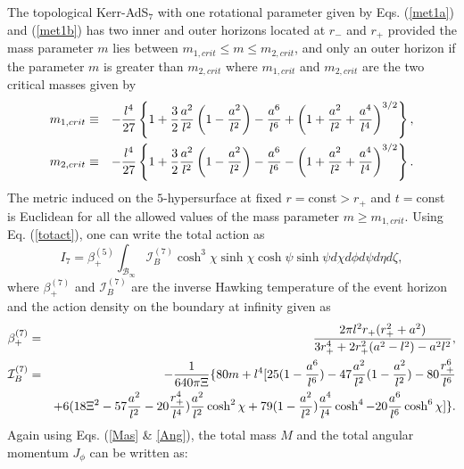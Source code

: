 \documentclass[a4paper,12pt,onecolumn]{revtex4}
\begin{document}
The topological Kerr-AdS$_7$ with one rotational parameter given
by Eqs. (\ref{met1a}) and (\ref{met1b}) has two inner and outer horizons located at $%
r_{-}$ and $r_{+}$ provided the mass parameter $m$ lies between $%
m_{1,crit}\leq m\leq m_{2,crit}$, and only an outer horizon if the parameter $%
m$ is greater than $m_{2,crit}$ where $m_{1,crit}$ and
$m_{2,crit}$ are the two critical masses given by
\begin{eqnarray}
m_{1,crit} &\equiv &-\frac{l^4}{27}\left\{1+\frac 32\frac{a^2}{l^2}\left(1-\frac{a^2}{%
l^2}\right)-\frac{a^6}{l^6}+\left(1+\frac{a^2}{l^2}+\frac{a^4}{l^4}\right)^{3/2}\right\},
\label{m1crit7} \\
m_{2,crit} &\equiv &-\frac{l^4}{27} \left\{1+\frac 32\frac{a^2}{l^2}\left(1-\frac{a^2}{%
l^2}\right)-\frac{a^6}{l^6}-\left(1+\frac{a^2}{l^2}+\frac{a^4}{l^4}\right)^{3/2}\right\}.
\label{M2crit7}
\end{eqnarray}
The metric induced on the $5$-hypersurface at fixed
$r=$const$>r_{+}$ and $t=$const is Euclidean for all the allowed
values of the mass parameter $m\geq m_{1,crit}$. Using Eq.
(\ref{totact}), one can write the total action as
\begin{equation}
I_7=\beta _{+}^{(5)}\int_{\mathcal{B}_\infty }\mathcal{I}_B^{(7)}\cosh
^3\chi \sinh \chi \cosh \psi \sinh \psi d\chi d\phi d\psi d\eta d\zeta ,
\label{Act7}
\end{equation}
where $\beta _{+}^{(7)}$ and $\mathcal{I}_B^{(7)}$ are the inverse
Hawking temperature of the event horizon and the action density on
the boundary at infinity given as
\begin{eqnarray*}
\beta _{+}^{(7)} &=&\frac{2\pi l^2r_{+}(r_{+}^2+a^2)}{%
3r_{+}^4+2r_{+}^2(a^2-l^2)-a^2l^2},  \label{Alph7} \\
\mathcal{I}_B^{(7)} &=&-\frac 1{640\pi \Xi } \{80m+l^4
[25(1-\frac{a^6}{l^6})-47 \frac{a^2}{l^2}(1-\frac{a^2}{l^2})-80
\frac{r^6_{+}}{l^6}\\ && +6(18 \Xi ^2-57 \frac{a^2}{l^2}-20
\frac{r^4_{+}}{l^4}) \frac{a^2}{l^2}\cosh ^2\chi
 +79 (1-\frac{a^2}{l^2}) \frac{a^4}{l^4}\cosh ^4
-20 \frac{a^6}{l^6}\cosh ^6\chi] \}.
\end{eqnarray*}
Again using Eqs. (\ref{Mas} \& \ref{Ang}), the total mass $M$ and the total
angular momentum $J_\phi $ can be written as:
\end{document}
